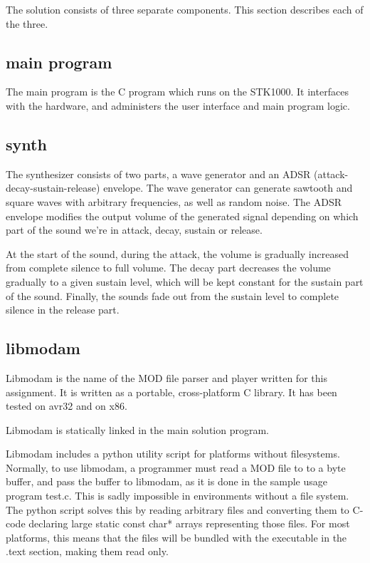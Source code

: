 The solution consists of three separate components. This section describes each of the three.

\subsection{main program}

The main program is the C program which runs on the STK1000.
It interfaces with the hardware, and administers the user interface and main program logic.

\subsection{synth}

The synthesizer consists of two parts, a wave generator and an ADSR (attack-decay-sustain-release) envelope.
The wave generator can generate sawtooth and square waves with arbitrary frequencies, as well as random noise.
The ADSR envelope modifies the output volume of the generated signal depending on which part of the sound we're in attack, decay, sustain or release.

At the start of the sound, during the attack, the volume is gradually increased from complete silence to full volume.
The decay part decreases the volume gradually to a given sustain level, which will be kept constant for the sustain part of the sound.
Finally, the sounds fade out from the sustain level to complete silence in the release part.

\subsection{libmodam}

Libmodam is the name of the MOD file parser and player written for this assignment.
It is written as a portable, cross-platform C library.
It has been tested on avr32 and on x86.

Libmodam is statically linked in the main solution program.

Libmodam includes a python utility script for platforms without filesystems.
Normally, to use libmodam, a programmer must read a MOD file to to a byte buffer, and pass the buffer to libmodam, as it is done in the sample usage program test.c.
This is sadly impossible in environments without a file system.
The python script solves this by reading arbitrary files and converting them to C-code declaring large static const char* arrays representing those files.
For most platforms, this means that the files will be bundled with the executable in the .text section, making them read only.

